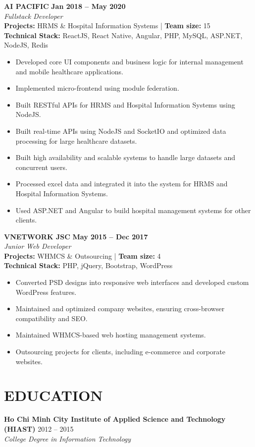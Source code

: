 \documentclass[11pt,a4paper]{article}
\begin{document}
\vspace{8pt}

\noindent \textbf{AI PACIFIC} \hfill \textbf{Jan 2018 -- May 2020} \\
\textit{Fullstack Developer} \\
\noindent \textbf{Projects:} HRMS \& Hospital Information Systems | \textbf{Team size:} 15 \\
\noindent \textbf{Technical Stack:} ReactJS, React Native, Angular, PHP, MySQL, ASP.NET, NodeJS, Redis
\begin{itemize}
    \item Developed core UI components and business logic for internal management and mobile healthcare applications.
    \item Implemented micro-frontend using module federation.
    \item Built RESTful APIs for HRMS and Hospital Information Systems using NodeJS.
    \item Built real-time APIs using NodeJS and SocketIO and optimized data processing for large healthcare datasets.
    \item Built high availability and scalable systems to handle large datasets and concurrent users.
    \item Processed excel data and integrated it into the system for HRMS and Hospital Information Systems.
    \item Used ASP.NET and Angular to build hospital management systems for other clients.
\end{itemize}

\vspace{8pt}

\noindent \textbf{VNETWORK JSC} \hfill \textbf{May 2015 -- Dec 2017} \\
\textit{Junior Web Developer} \\
\noindent \textbf{Projects:} WHMCS \& Outsourcing | \textbf{Team size:} 4 \\
\noindent \textbf{Technical Stack:} PHP, jQuery, Bootstrap, WordPress
\begin{itemize}
    \item Converted PSD designs into responsive web interfaces and developed custom WordPress features.
    \item Maintained and optimized company websites, ensuring cross-browser compatibility and SEO.
    \item Maintained WHMCS-based web hosting management systems.
    \item Outsourcing projects for clients, including e-commerce and corporate websites.
\end{itemize}

\vspace{8pt}

\section*{EDUCATION}
\noindent\textbf{Ho Chi Minh City Institute of Applied Science and Technology (HIAST)} \hfill 2012 -- 2015\\
\textit{College Degree in Information Technology}
\end{document}

